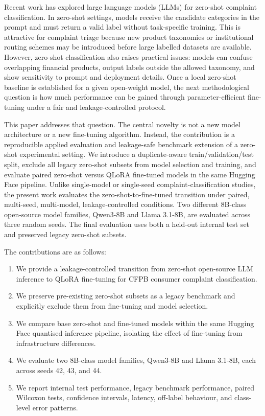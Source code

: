 \documentclass{elektr}
\begin{document}
Recent work has explored large language models (LLMs) for zero-shot complaint classification. In zero-shot settings, models receive the candidate categories in the prompt and must return a valid label without task-specific training. This is attractive for complaint triage because new product taxonomies or institutional routing schemes may be introduced before large labelled datasets are available. However, zero-shot classification also raises practical issues: models can confuse overlapping financial products, output labels outside the allowed taxonomy, and show sensitivity to prompt and deployment details. Once a local zero-shot baseline is established for a given open-weight model, the next methodological question is how much performance can be gained through parameter-efficient fine-tuning under a fair and leakage-controlled protocol.

This paper addresses that question. The central novelty is not a new model architecture or a new fine-tuning algorithm. Instead, the contribution is a reproducible applied evaluation and leakage-safe benchmark extension of a zero-shot experimental setting. We introduce a duplicate-aware train/validation/test split, exclude all legacy zero-shot subsets from model selection and training, and evaluate paired zero-shot versus QLoRA fine-tuned models in the same Hugging Face pipeline. Unlike single-model or single-seed complaint-classification studies, the present work evaluates the zero-shot-to-fine-tuned transition under paired, multi-seed, multi-model, leakage-controlled conditions. Two different 8B-class open-source model families, Qwen3-8B and Llama 3.1-8B, are evaluated across three random seeds. The final evaluation uses both a held-out internal test set and preserved legacy zero-shot subsets.

The contributions are as follows:
\begin{enumerate}
    \item We provide a leakage-controlled transition from zero-shot open-source LLM inference to QLoRA fine-tuning for CFPB consumer complaint classification.
    \item We preserve pre-existing zero-shot subsets as a legacy benchmark and explicitly exclude them from fine-tuning and model selection.
    \item We compare base zero-shot and fine-tuned models within the same Hugging Face quantised inference pipeline, isolating the effect of fine-tuning from infrastructure differences.
    \item We evaluate two 8B-class model families, Qwen3-8B and Llama 3.1-8B, each across seeds 42, 43, and 44.
    \item We report internal test performance, legacy benchmark performance, paired Wilcoxon tests, confidence intervals, latency, off-label behaviour, and class-level error patterns.
\end{enumerate}
\end{document}
